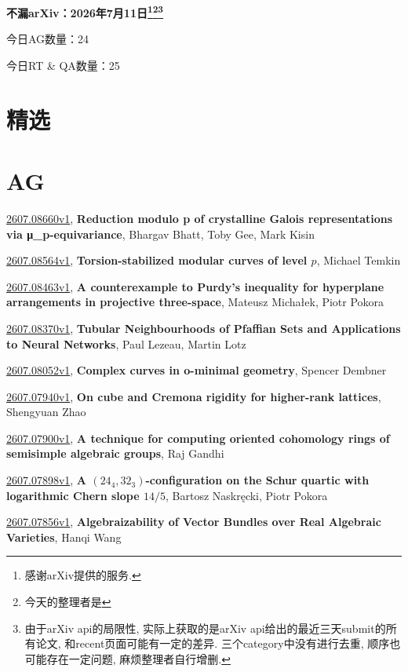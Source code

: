 \documentclass[9pt, a4paper]{article}
\theoremstyle{plain}
\theoremstyle{definition}
\theoremstyle{remark}
\newcommand{\arxiv}[3]{\href{https://arxiv.org/abs/#1}{#1}, \textbf{\textcolor{arxivblue}{#2}}, #3}
\newcommand{\AGnumber}{24}
\newcommand{\RTQAnumber}{25}
\newcommand{\NewestDate}{2026年7月11日}
\newcommand{\todayarXiver}{} %
\begin{document}
\begin{center}
    \Huge\textbf{不漏arXiv：\NewestDate\footnote{感谢arXiv提供的服务.}\footnote{今天的整理者是\todayarXiver}\footnote{由于arXiv api的局限性, 实际上获取的是arXiv api给出的最近三天submit的所有论文, 和recent页面可能有一定的差异. 三个category中没有进行去重, 顺序也可能存在一定问题, 麻烦整理者自行增删.}} \\
\end{center}

\setcounter{section}{-1}

\begin{center}
    今日AG数量：\AGnumber
    
    今日RT \& QA数量：\RTQAnumber
    
\end{center}


\section{精选}


\section{AG}
\arxiv{2607.08660v1}{Reduction modulo p of crystalline Galois representations via μ_p-equivariance}{Bhargav Bhatt, Toby Gee, Mark Kisin}

\arxiv{2607.08564v1}{Torsion-stabilized modular curves of level $p$}{Michael Temkin}

\arxiv{2607.08463v1}{A counterexample to Purdy's inequality for hyperplane arrangements in projective three-space}{Mateusz Michałek, Piotr Pokora}

\arxiv{2607.08370v1}{Tubular Neighbourhoods of Pfaffian Sets and Applications to Neural Networks}{Paul Lezeau, Martin Lotz}

\arxiv{2607.08052v1}{Complex curves in o-minimal geometry}{Spencer Dembner}

\arxiv{2607.07940v1}{On cube and Cremona rigidity for higher-rank lattices}{Shengyuan Zhao}

\arxiv{2607.07900v1}{A technique for computing oriented cohomology rings of semisimple algebraic groups}{Raj Gandhi}

\arxiv{2607.07898v1}{A $(24_4,32_3)$-configuration on the Schur quartic with logarithmic Chern slope $14/5$}{Bartosz Naskręcki, Piotr Pokora}

\arxiv{2607.07856v1}{Algebraizability of Vector Bundles over Real Algebraic Varieties}{Hanqi Wang}
\end{document}
